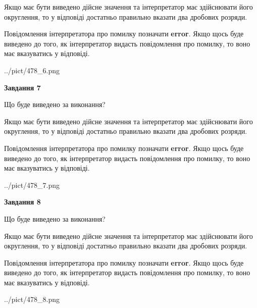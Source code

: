 \documentclass[12pt, ukrainian]{article}
\begin{document}
{\begin {Large}
Якщо має бути виведено дійсне значення та інтерпретатор має здійснювати його округлення, 
то у відповіді достатньо правильно вказати два дробових розряди.

Повідомлення інтерпретатора про помилку позначати \textbf{error}.
Якщо щось буде виведено до того, як інтерпретатор видасть повідомлення про помилку, 
то воно має вказуватись у відповіді. \par

\begin{center}
	{../pict/478_6.png}
\end{center}
\newpage

{\begin {center}\textbf{Завдання 7}\end {center}}\par
Що буде виведено за виконання? \par

Якщо має бути виведено дійсне значення та інтерпретатор має здійснювати його округлення, 
то у відповіді достатньо правильно вказати два дробових розряди.

Повідомлення інтерпретатора про помилку позначати \textbf{error}.
Якщо щось буде виведено до того, як інтерпретатор видасть повідомлення про помилку, 
то воно має вказуватись у відповіді. \par

\begin{center}
	{../pict/478_7.png}
\end{center}
\newpage

{\begin {center}\textbf{Завдання 8}\end {center}}\par
Що буде виведено за виконання? \par

Якщо має бути виведено дійсне значення та інтерпретатор має здійснювати його округлення, 
то у відповіді достатньо правильно вказати два дробових розряди.

Повідомлення інтерпретатора про помилку позначати \textbf{error}.
Якщо щось буде виведено до того, як інтерпретатор видасть повідомлення про помилку, 
то воно має вказуватись у відповіді. \par

\begin{center}
	{../pict/478_8.png}
\end{center}
\newpage


\end{Large}}
\end{document}
